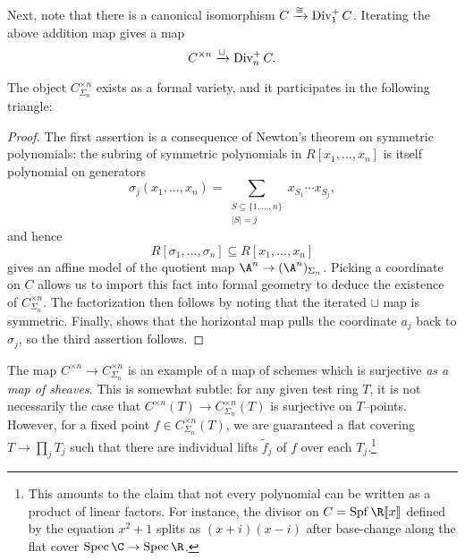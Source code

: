 Next, note that there is a canonical isomorphism \(C \xrightarrow{\cong} \operatorname{Div}_1^+ C\).  Iterating the above addition map gives a map \[C^{\times n} \xrightarrow{\sqcup} \operatorname{Div}_n^+ C.\]
\begin{lemma}\label{SymmetricAffinesExist}
The object \(C^{\times n}_{\Sigma_n}\) exists as a formal variety, and it participates in the following triangle:
\begin{center}
\end{center}
\end{lemma}
\begin{proof}
The first assertion is a consequence of Newton's theorem on symmetric polynomials: the subring of symmetric polynomials in \(R[x_1, \ldots, x_n]\) is itself polynomial on generators \[\sigma_j(x_1, \ldots, x_n) = \sum_{\substack{S \subseteq \{1, \ldots, n\} \\ |S| = j}} x_{S_1} \cdots x_{S_j},\] and hence \[R[\sigma_1, \ldots, \sigma_n] \subseteq R[x_1, \ldots, x_n]\] gives an affine model of the quotient map \(\A^n \to (\A^n)_{\Sigma_n}\).  Picking a coordinate on \(C\) allows us to import this fact into formal geometry to deduce the existence of \(C^{\times n}_{\Sigma_n}\).  The factorization then follows by noting that the iterated \(\sqcup\) map is symmetric.  Finally,  shows that the horizontal map pulls the coordinate \(a_j\) back to \(\sigma_j\), so the third assertion follows.
\end{proof}

\begin{remark}
The map \(C^{\times n} \to C^{\times n}_{\Sigma_n}\) is an example of a map of schemes which is surjective \emph{as a map of sheaves}.  This is somewhat subtle: for any given test ring \(T\), it is not necessarily the case that \(C^{\times n}(T) \to C^{\times n}_{\Sigma_n}(T)\) is surjective on \(T\)--points.  However, for a fixed point \(f \in C^{\times n}_{\Sigma_n}(T)\), we are guaranteed a flat covering \(T \to \prod_j T_j\) such that there are individual lifts \(\widetilde f_j\) of \(f\) over each \(T_j\).\footnote{This amounts to the claim that not every polynomial can be written as a product of linear factors.  For instance, the divisor on \(C = \Spf \R\ps{x}\) defined by the equation \(x^2 + 1\) splits as \((x + i)(x - i)\) after base-change along the flat cover \(\Spec \C \to \Spec \R\).}
\end{remark}

